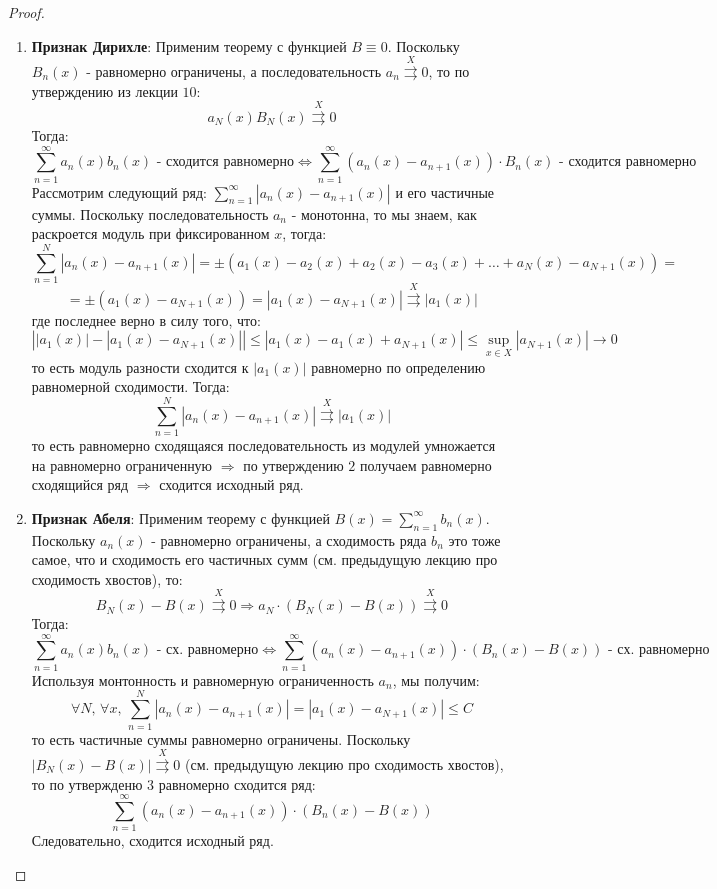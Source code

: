 \documentclass[12pt]{article}
\theoremstyle{definition}
\newcommand{\ddsum}[2]{\displaystyle\sum\limits_{#1}^{#2}}
\newcommand{\uconv}[1]{\overset{#1}{\rightrightarrows}}
\begin{document}
\begin{proof}\hfill
	\begin{enumerate}[label={\arabic*)}]
		\item \textbf{Признак Дирихле}: Применим теорему с функцией $B \equiv 0$. Поскольку $B_n(x)$ - равномерно ограничены, а последовательность $a_n \uconv{X} 0$, то по утверждению из лекции $10$: 
		$$
			a_N(x)B_N(x) \uconv{X} 0
		$$ 
		Тогда:
		$$
	 		\ddsum{n = 1}{\infty}a_n(x)b_n(x) \text{ - сходится равномерно} \Leftrightarrow \ddsum{n = 1}{\infty} \left(a_n(x) - a_{n + 1}(x)\right){\cdot} B_n(x) \text{ - сходится равномерно}
		$$
		Рассмотрим следующий ряд: $\ddsum{n = 1}{\infty} |a_n(x) - a_{n + 1}(x)|$ и его частичные суммы. Поскольку последовательность $a_n$ - монотонна, то мы знаем, как раскроется модуль при фиксированном $x$, тогда:
		$$
			\ddsum{n = 1}{N} \left|a_n(x) - a_{n+1}(x)\right| = \pm\left(a_1(x) - a_2(x) + a_2(x) - a_3(x) + \dotsc + a_N(x) - a_{N+1}(x)\right) = 
		$$
		$$	
			= \pm(a_1(x) - a_{N+1}(x)) = \left|a_1(x) - a_{N+1}(x)\right| \uconv{X} |a_1(x)|
		$$
		где последнее верно в силу того, что:
		$$
			\left| |a_1(x)| - \left|a_1(x) - a_{N+1}(x)\right| \right| \leq \left|a_1(x) - a_1(x) + a_{N+1}(x)\right| \leq \sup\limits_{x \in X} \left|a_{N+1}(x)\right| \to 0
		$$
		то есть модуль разности сходится к $|a_1(x)|$ равномерно по определению равномерной сходимости. Тогда:
		$$
			\ddsum{n = 1}{N}|a_n(x) - a_{n+1}(x)| \uconv{X} |a_1(x)|
		$$
		то есть равномерно сходящаяся последовательность из модулей умножается на равномерно ограниченную $\Rightarrow$ по утверждению $2$ получаем равномерно сходящийся ряд $\Rightarrow$ сходится исходный ряд. 
		\item \textbf{Признак Абеля}: Применим теорему с функцией $B(x) = \ddsum{n = 1}{\infty}b_n(x)$. Поскольку $a_n(x)$ - равномерно ограничены, а сходимость ряда $b_n$ это тоже самое, что и сходимость его частичных сумм (см. предыдущую лекцию про сходимость хвостов), то: 
		$$
			B_N(x) - B(x) \uconv{X} 0 \Rightarrow a_N{\cdot}(B_N(x) - B(x)) \uconv{X} 0
		$$
		Тогда:
		$$
			\ddsum{n = 1}{\infty}a_n(x)b_n(x) \text{ - сх. равномерно} \Leftrightarrow \ddsum{n = 1}{\infty} \left(a_n(x) - a_{n + 1}(x)\right){\cdot} \left(B_n(x) - B(x)\right) \text{ - сх. равномерно}
		$$
		Используя монтонность и равномерную ограниченность $a_n$, мы получим:
		$$
			\forall N, \, \forall x, \, \ddsum{n = 1}{N}|a_n(x) - a_{n+1}(x)| = \left|a_1(x) - a_{N+1}(x)\right| \leq C
		$$
		то есть частичные суммы равномерно ограничены. Поскольку $|B_N(x) - B(x)| \uconv{X} 0$ (см. предыдущую лекцию про сходимость хвостов), то по утвержденю $3$ равномерно сходится ряд: 
		$$
			\ddsum{n = 1}{\infty} \left(a_n(x) - a_{n + 1}(x)\right){\cdot} \left(B_n(x) - B(x)\right) 
		$$ 
		Следовательно, сходится исходный ряд.
	\end{enumerate}	
\end{proof}
\end{document}
